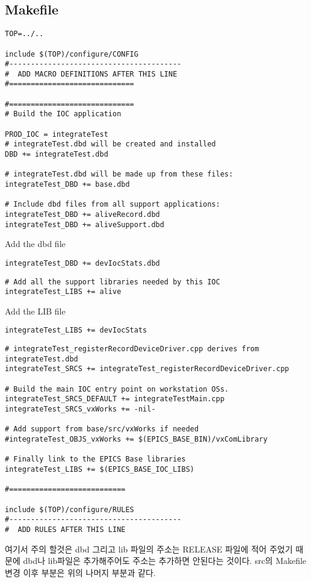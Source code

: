 \documentclass[11pt
  , a4paper
  , article
  , oneside
]{memoir}
\begin{document}
\subsection{Makefile}
\begin{lstlisting}[style=termstyle]
TOP=../..

include $(TOP)/configure/CONFIG
#----------------------------------------
#  ADD MACRO DEFINITIONS AFTER THIS LINE
#=============================

#=============================
# Build the IOC application

PROD_IOC = integrateTest
# integrateTest.dbd will be created and installed
DBD += integrateTest.dbd

# integrateTest.dbd will be made up from these files:
integrateTest_DBD += base.dbd

# Include dbd files from all support applications:
integrateTest_DBD += aliveRecord.dbd
integrateTest_DBD += aliveSupport.dbd
\end{lstlisting}
Add the dbd file
\begin{lstlisting}[style=termstyle]
integrateTest_DBD += devIocStats.dbd
\end{lstlisting}
\begin{lstlisting}[style=termstyle]
# Add all the support libraries needed by this IOC
integrateTest_LIBS += alive
\end{lstlisting}
Add the LIB file
\begin{lstlisting}[style=termstyle]
integrateTest_LIBS += devIocStats
\end{lstlisting}
\begin{lstlisting}[style=termstyle]
# integrateTest_registerRecordDeviceDriver.cpp derives from integrateTest.dbd
integrateTest_SRCS += integrateTest_registerRecordDeviceDriver.cpp

# Build the main IOC entry point on workstation OSs.
integrateTest_SRCS_DEFAULT += integrateTestMain.cpp
integrateTest_SRCS_vxWorks += -nil-

# Add support from base/src/vxWorks if needed
#integrateTest_OBJS_vxWorks += $(EPICS_BASE_BIN)/vxComLibrary

# Finally link to the EPICS Base libraries
integrateTest_LIBS += $(EPICS_BASE_IOC_LIBS)

#===========================

include $(TOP)/configure/RULES
#----------------------------------------
#  ADD RULES AFTER THIS LINE
\end{lstlisting}
여기서 주의 할것은 dbd 그리고 lib 파일의 주소는 RELEASE 파일에 적어 주었기 때문에 dbd나 lib파일은 추가해주어도 주소는 추가하면 안된다는 것이다.
src의 Makefile변경 이후 부분은 위의 나머지 부분과 같다.
\end{document}
